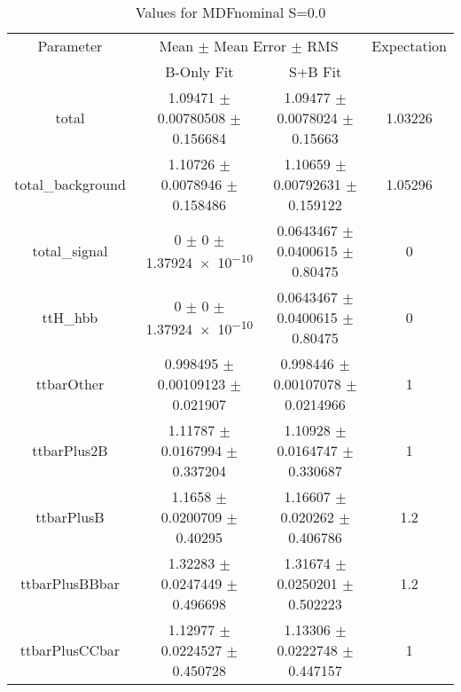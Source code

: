 \begin{table}
\centering
\caption{Values for MDFnominal S=0.0}
\begin{tabular}{cccc}
\toprule
Parameter & \multicolumn{2}{c}{Mean $\pm$ Mean Error $\pm$ RMS} & Expectation\\
 & B-Only Fit & S+B Fit & \\
\midrule
total & \num{1.09471} $\pm$ \num{0.00780508} $\pm$ \num{0.156684} & \num{1.09477} $\pm$ \num{0.0078024} $\pm$ \num{0.15663} & \num{1.03226}\\
total\_background & \num{1.10726} $\pm$ \num{0.0078946} $\pm$ \num{0.158486} & \num{1.10659} $\pm$ \num{0.00792631} $\pm$ \num{0.159122} & \num{1.05296}\\
total\_signal & \num{0} $\pm$ \num{0} $\pm$ \num{1.37924e-10} & \num{0.0643467} $\pm$ \num{0.0400615} $\pm$ \num{0.80475} & \num{0}\\
ttH\_hbb & \num{0} $\pm$ \num{0} $\pm$ \num{1.37924e-10} & \num{0.0643467} $\pm$ \num{0.0400615} $\pm$ \num{0.80475} & \num{0}\\
ttbarOther & \num{0.998495} $\pm$ \num{0.00109123} $\pm$ \num{0.021907} & \num{0.998446} $\pm$ \num{0.00107078} $\pm$ \num{0.0214966} & \num{1}\\
ttbarPlus2B & \num{1.11787} $\pm$ \num{0.0167994} $\pm$ \num{0.337204} & \num{1.10928} $\pm$ \num{0.0164747} $\pm$ \num{0.330687} & \num{1}\\
ttbarPlusB & \num{1.1658} $\pm$ \num{0.0200709} $\pm$ \num{0.40295} & \num{1.16607} $\pm$ \num{0.020262} $\pm$ \num{0.406786} & \num{1.2}\\
ttbarPlusBBbar & \num{1.32283} $\pm$ \num{0.0247449} $\pm$ \num{0.496698} & \num{1.31674} $\pm$ \num{0.0250201} $\pm$ \num{0.502223} & \num{1.2}\\
ttbarPlusCCbar & \num{1.12977} $\pm$ \num{0.0224527} $\pm$ \num{0.450728} & \num{1.13306} $\pm$ \num{0.0222748} $\pm$ \num{0.447157} & \num{1}\\
\bottomrule
\end{tabular}
\end{table}